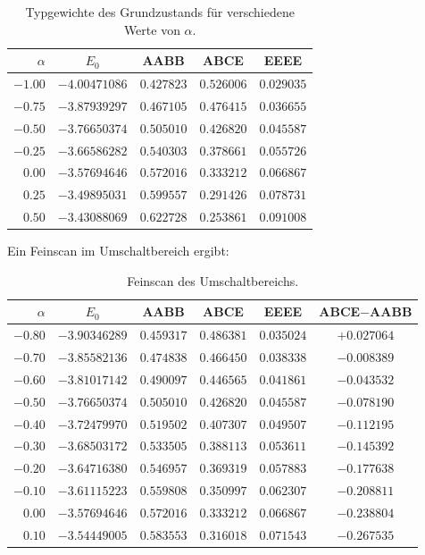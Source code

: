 \documentclass[11pt,a4paper]{article}
\begin{document}
	\begin{table}[h]
		\centering
		\begin{tabular}{rcccc}
			\toprule
			$\alpha$ & $E_0$ & AABB & ABCE & EEEE \\
			\midrule
			$-1.00$ & $-4.00471086$ & $0.427823$ & $0.526006$ & $0.029035$ \\
			$-0.75$ & $-3.87939297$ & $0.467105$ & $0.476415$ & $0.036655$ \\
			$-0.50$ & $-3.76650374$ & $0.505010$ & $0.426820$ & $0.045587$ \\
			$-0.25$ & $-3.66586282$ & $0.540303$ & $0.378661$ & $0.055726$ \\
			$0.00$  & $-3.57694646$ & $0.572016$ & $0.333212$ & $0.066867$ \\
			$0.25$  & $-3.49895031$ & $0.599557$ & $0.291426$ & $0.078731$ \\
			$0.50$  & $-3.43088069$ & $0.622728$ & $0.253861$ & $0.091008$ \\
			\bottomrule
		\end{tabular}
		\caption{Typgewichte des Grundzustands für verschiedene Werte von \(\alpha\).}
	\end{table}
	
	Ein Feinscan im Umschaltbereich ergibt:
	
	\begin{table}[h]
		\centering
		\begin{tabular}{rccccc}
			\toprule
			$\alpha$ & $E_0$ & AABB & ABCE & EEEE & ABCE$-$AABB \\
			\midrule
			$-0.80$ & $-3.90346289$ & $0.459317$ & $0.486381$ & $0.035024$ & $+0.027064$ \\
			$-0.70$ & $-3.85582136$ & $0.474838$ & $0.466450$ & $0.038338$ & $-0.008389$ \\
			$-0.60$ & $-3.81017142$ & $0.490097$ & $0.446565$ & $0.041861$ & $-0.043532$ \\
			$-0.50$ & $-3.76650374$ & $0.505010$ & $0.426820$ & $0.045587$ & $-0.078190$ \\
			$-0.40$ & $-3.72479970$ & $0.519502$ & $0.407307$ & $0.049507$ & $-0.112195$ \\
			$-0.30$ & $-3.68503172$ & $0.533505$ & $0.388113$ & $0.053611$ & $-0.145392$ \\
			$-0.20$ & $-3.64716380$ & $0.546957$ & $0.369319$ & $0.057883$ & $-0.177638$ \\
			$-0.10$ & $-3.61115223$ & $0.559808$ & $0.350997$ & $0.062307$ & $-0.208811$ \\
			$0.00$  & $-3.57694646$ & $0.572016$ & $0.333212$ & $0.066867$ & $-0.238804$ \\
			$0.10$  & $-3.54449005$ & $0.583553$ & $0.316018$ & $0.071543$ & $-0.267535$ \\
			\bottomrule
		\end{tabular}
		\caption{Feinscan des Umschaltbereichs.}
	\end{table}
	
\end{document}
